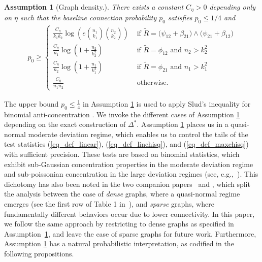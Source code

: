 \documentclass{article}
\newtheorem{assumption}{Assumption}
\begin{document}
\begin{assumption}[Graph density.]\label{asmp:dense}
    There exists a constant $C_\eta > 0$ depending only on $\eta$ such that the baseline connection probability $p_0$ satisfies $p_0 \leq 1/4$ and
    \begin{align*}
        p_0 \geq \begin{cases}
            \frac{C_\eta}{k_1k_2} \log\left(e{n_1 \choose k_1}{n_2 \choose k_2}\right) & \text{ if } \tilde R = \big(\psi_{12} + \beta_{21}\big) \land \big(\psi_{21} + \beta_{12}\big)\\[5pt]
            \frac{C_\eta}{n_1} \log\left(1+ \frac{n_2}{k_2^2}\right) & \text{ if } \tilde R = \phi_{12} \text{ and } n_2>k_2^2\\[5pt]
            \frac{C_\eta}{n_2} \log\left(1+ \frac{n_1}{k_1^2}\right) & \text{ if } \tilde R = \phi_{21} \text{ and } n_1>k_1^2\\[5pt]
            \frac{C_\eta}{n_1n_2} & \text{ otherwise.}
        \end{cases} 
    \end{align*}
\end{assumption}
The upper bound $p_0 \leq \frac14$ in Assumption \ref{asmp:dense} is used to apply Slud's inequality for binomial anti-concentration \cite{slud1977distribution}. We invoke the different cases of Assumption \ref{asmp:dense} depending on the exact construction of $\Delta^*$. 
Assumption \ref{asmp:dense} places us in a quasi-normal moderate deviation regime, which enables us to control the tails of the test statistics (\ref{eq_def_linear}), (\ref{eq_def_linchisq}), and (\ref{eq_def_maxchisq}) with sufficient precision. 
These tests are based on binomial statistics, which exhibit sub-Gaussian concentration properties in the moderate deviation regime and sub-poissonian concentration in the large deviation regimes (see, e.g.,~\cite{arias2015sparse,chhor2021goodness,kotekal2024locally,chhor2022sharp}).
This dichotomy has also been noted in the two companion papers~\cite{arias2014community} and \cite{verzelen2015community}, which split the analysis between the case of  \textit{dense} graphs, where a quasi-normal regime emerges (see the first row of Table 1 in~\cite{arias2014community}), and \textit{sparse} graphs, where fundamentally different behaviors occur due to lower connectivity. 
In this paper, we follow the same approach by restricting to dense graphs as specified in Assumption~\ref{asmp:dense}, and leave the case of sparse graphs for future work. 
 Furthermore, Assumption \ref{asmp:dense} has a natural probabilistic interpretation, as codified in the following propositions.
\end{document}
